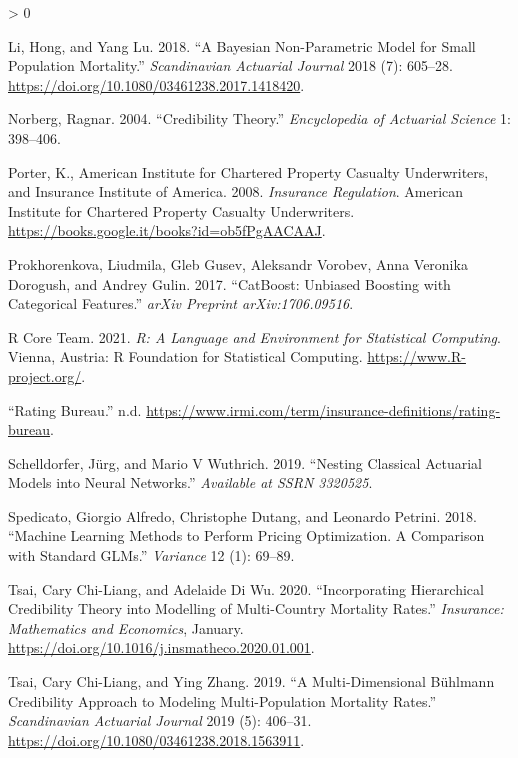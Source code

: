 \documentclass[
]{article}
\newlength{\cslhangindent}
\newenvironment{CSLReferences}[2] %
 {%
  \setlength{\parindent}{0pt}
  \ifodd #1 \everypar{\setlength{\hangindent}{\cslhangindent}}\ignorespaces\fi
  \ifnum #2 > 0
  \setlength{\parskip}{#2\baselineskip}
  \fi
 }%
 {}
\begin{document}
\begin{CSLReferences}{1}{0}
\leavevmode\hypertarget{ref-libayesian2018}{}%
Li, Hong, and Yang Lu. 2018. {``A {Bayesian} Non-Parametric Model for
Small Population Mortality.''} \emph{Scandinavian Actuarial Journal}
2018 (7): 605--28. \url{https://doi.org/10.1080/03461238.2017.1418420}.

\leavevmode\hypertarget{ref-norberg2004credibility}{}%
Norberg, Ragnar. 2004. {``Credibility Theory.''} \emph{Encyclopedia of
Actuarial Science} 1: 398--406.

\leavevmode\hypertarget{ref-porter2008insurance}{}%
Porter, K., American Institute for Chartered Property Casualty
Underwriters, and Insurance Institute of America. 2008. \emph{Insurance
Regulation}. American Institute for Chartered Property Casualty
Underwriters. \url{https://books.google.it/books?id=ob5fPgAACAAJ}.

\leavevmode\hypertarget{ref-prokhorenkova2017catboost}{}%
Prokhorenkova, Liudmila, Gleb Gusev, Aleksandr Vorobev, Anna Veronika
Dorogush, and Andrey Gulin. 2017. {``CatBoost: Unbiased Boosting with
Categorical Features.''} \emph{arXiv Preprint arXiv:1706.09516}.

\leavevmode\hypertarget{ref-RSoftware}{}%
R Core Team. 2021. \emph{R: A Language and Environment for Statistical
Computing}. Vienna, Austria: R Foundation for Statistical Computing.
\url{https://www.R-project.org/}.

\leavevmode\hypertarget{ref-rating_bureau}{}%
{``Rating Bureau.''} n.d.
\url{https://www.irmi.com/term/insurance-definitions/rating-bureau}.

\leavevmode\hypertarget{ref-schelldorfer2019nesting}{}%
Schelldorfer, Jürg, and Mario V Wuthrich. 2019. {``Nesting Classical
Actuarial Models into Neural Networks.''} \emph{Available at SSRN
3320525}.

\leavevmode\hypertarget{ref-spedicato2018machine}{}%
Spedicato, Giorgio Alfredo, Christophe Dutang, and Leonardo Petrini.
2018. {``Machine Learning Methods to Perform Pricing Optimization. A
Comparison with Standard GLMs.''} \emph{Variance} 12 (1): 69--89.

\leavevmode\hypertarget{ref-tsaiincorporating2020}{}%
Tsai, Cary Chi-Liang, and Adelaide Di Wu. 2020. {``Incorporating
Hierarchical Credibility Theory into Modelling of Multi-Country
Mortality Rates.''} \emph{Insurance: Mathematics and Economics},
January. \url{https://doi.org/10.1016/j.insmatheco.2020.01.001}.

\leavevmode\hypertarget{ref-tsaimultidimensional2019}{}%
Tsai, Cary Chi-Liang, and Ying Zhang. 2019. {``A Multi-Dimensional
{B{ü}hlmann} Credibility Approach to Modeling Multi-Population Mortality
Rates.''} \emph{Scandinavian Actuarial Journal} 2019 (5): 406--31.
\url{https://doi.org/10.1080/03461238.2018.1563911}.


\end{CSLReferences}
\end{document}
